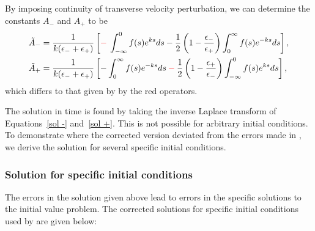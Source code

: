 \documentclass[12pt]{../style-files/ociamthesis}
\begin{document}
By imposing continuity of transverse velocity perturbation, we can determine the constants $A_-$ and $A_+$ to be
\begin{align}
\tilde{A}_- & = \frac{1}{k(\epsilon_- + \epsilon_+)}\left[\textcolor{red}{-} \: \int_{-\infty}^0 f(s)e^{ks} ds - \frac{1}{2}\left(1 - \frac{\epsilon_-}{\epsilon_+}\right)\int_0^\infty f(s)e^{-ks} ds\right], \\
\tilde{A}_+ & = \frac{1}{k(\epsilon_- + \epsilon_+)}\left[-\int_0^\infty f(s)e^{-ks} ds \: \textcolor{red}{-} \: \frac{1}{2}\left(1 - \frac{\epsilon_+}{\epsilon_-}\right)\int_{-\infty}^0 f(s)e^{ks} ds\right],
\end{align}
which differs to that given by \cite{rae_etal81} by the red operators.

The solution in time is found by taking the inverse Laplace transform of Equations~\eqref{sol -} and~\eqref{sol +}. This is not possible for arbitrary initial conditions. To demonstrate where the corrected version deviated from the errors made in \cite{rae_etal81}, we derive the solution for several specific initial conditions.


\subsubsection{Solution for specific initial conditions}

The errors in the solution given above lead to errors in the specific solutions to the initial value problem. The corrected solutions for specific initial conditions used by \cite{rae_etal81} are given below:
\end{document}
